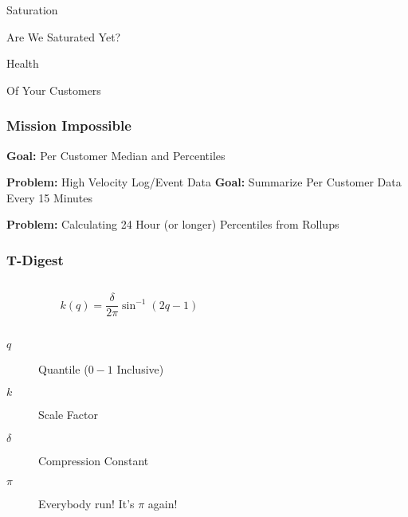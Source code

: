 \begin{frame}[standout]
    Saturation

    \small
    Are We Saturated Yet?
\end{frame}



\begin{frame}[standout]
    Health

    \small
    Of Your Customers
\end{frame}


\begin{frame}
    \frametitle{Mission Impossible}

    \textbf{Goal:} Per Customer Median and Percentiles

    \textbf{Problem:} High Velocity Log/Event Data
    \vskip 1cm
    \textbf{Goal:} Summarize Per Customer Data Every 15 Minutes

    \textbf{Problem:} Calculating 24 Hour (or longer) Percentiles from Rollups
\end{frame}

\begin{frame}
    \frametitle{T-Digest}

    \begin{columns}
        \begin{column}{0.4\textwidth}

            $$ k(q) = \frac{\delta}{2\pi} \sin^{-1}(2q-1) $$
            ~
            \begin{description}
                \item[$q$] Quantile ($0 - 1$ Inclusive)
                \item[$k$]  Scale Factor
                \item[$\delta$] Compression Constant
                \item[$\pi$] Everybody run!  It's $\pi$ again!
            \end{description}
        \end{column}
        \begin{column}{0.6\textwidth}
            \begin{figure}[!h]
                \centering
                \resizebox{\columnwidth}{!}{}
            \end{figure}
        \end{column}
    \end{columns}
\end{frame}

